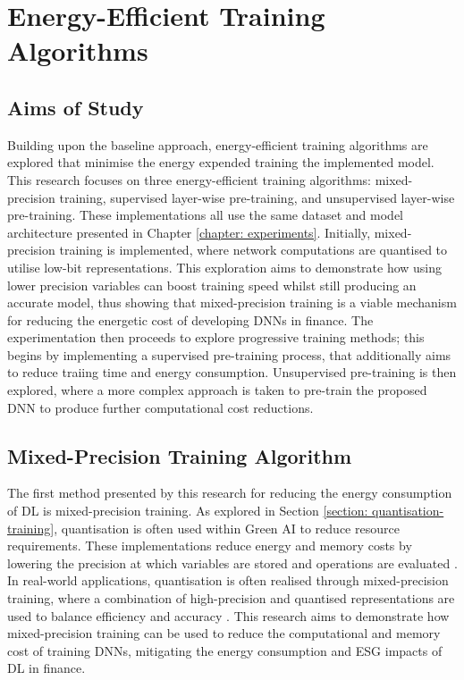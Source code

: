 \documentclass[a4paper, 11pt]{report}
\begin{document}
    \chapter{Energy-Efficient Training Algorithms}
    \label{chapter: energy-extensions}

    \section{Aims of Study}

    Building upon the baseline approach, energy-efficient training algorithms are explored that minimise the energy expended training the implemented model. This research focuses on three energy-efficient training algorithms: mixed-precision training, supervised layer-wise pre-training, and unsupervised layer-wise pre-training. These implementations all use the same dataset and model architecture presented in Chapter \ref{chapter: experiments}. Initially, mixed-precision training is implemented, where network computations are quantised to utilise low-bit representations. This exploration aims to demonstrate how using lower precision variables can boost training speed whilst still producing an accurate model, thus showing that mixed-precision training is a viable mechanism for reducing the energetic cost of developing DNNs in finance. The experimentation then proceeds to explore progressive training methods; this begins by implementing a supervised pre-training process, that additionally aims to reduce traiing time and energy consumption. Unsupervised pre-training is then explored, where a more complex approach is taken to pre-train the proposed DNN to produce further computational cost reductions.


    \section{Mixed-Precision Training Algorithm}
    \label{section: mixed-precision-method}

    The first method presented by this research for reducing the energy consumption of DL is mixed-precision training. As explored in Section \ref{section: quantisation-training}, quantisation is often used within Green AI to reduce resource requirements. These implementations reduce energy and memory costs by lowering the precision at which variables are stored and operations are evaluated \citep{fan-2020b}. In real-world applications, quantisation is often realised through mixed-precision training, where a combination of high-precision and quantised representations are used to balance efficiency and accuracy \citep{ott-2017}. This research aims to demonstrate how mixed-precision training can be used to reduce the computational and memory cost of training DNNs, mitigating the energy consumption and ESG impacts of DL in finance.
\end{document}
